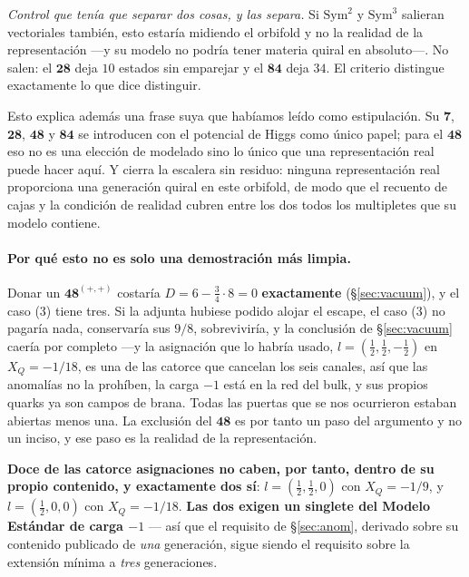 \documentclass[11pt,a4paper]{article}
\newcommand{\rep}[1]{\mathbf{#1}}
\newenvironment{keyeq}
  {\begin{center}\setlength{\fboxsep}{9pt}\setlength{\fboxrule}{0.8pt}%
   \begin{lrbox}{\keyeqbox}\begin{minipage}{0.88\textwidth}}
  {\end{minipage}\end{lrbox}%
   \fcolorbox{hdrblue!55}{hdrblue!6}{\usebox{\keyeqbox}}\end{center}}
\begin{document}
\emph{Control que tenía que separar dos cosas, y las separa.} Si $\mathrm{Sym}^2$ y $\mathrm{Sym}^3$
salieran vectoriales también, esto estaría midiendo el orbifold y no la realidad de la representación
---y su modelo no podría tener materia quiral en absoluto---. No salen: el $\rep{28}$ deja $10$
estados sin emparejar y el $\rep{84}$ deja $34$. El criterio distingue exactamente lo que dice
distinguir.

Esto explica además una frase suya que habíamos leído como estipulación. Su $\rep7$, $\rep{28}$,
$\rep{48}$ y $\rep{84}$ se introducen con el potencial de Higgs como único papel; para el $\rep{48}$
eso no es una elección de modelado sino lo único que una representación real puede hacer aquí. Y
cierra la escalera sin residuo: ninguna representación real proporciona una generación quiral en este
orbifold, de modo que el recuento de cajas y la condición de realidad cubren entre los dos todos los
multipletes que su modelo contiene.

\paragraph{Por qué esto no es solo una demostración más limpia.} Donar un $\rep{48}^{(+,+)}$ costaría
$D=6-\tfrac34\cdot8=0$ \textbf{exactamente} (\S\ref{sec:vacuum}), y el caso (3) tiene tres. Si la
adjunta hubiese podido alojar el escape, el caso (3) no pagaría nada, conservaría sus $9/8$,
sobreviviría, y la conclusión de \S\ref{sec:vacuum} caería por completo ---y la asignación que lo
habría usado, $l=(\tfrac12,\tfrac12,-\tfrac12)$ en $X_Q=-1/18$, es una de las catorce que cancelan
los seis canales, así que las anomalías no la prohíben, la carga $-1$ está en la red del bulk, y sus
propios quarks ya son campos de brana. Todas las puertas que se nos ocurrieron estaban abiertas menos
una. La exclusión del $\rep{48}$ es por tanto un paso del argumento y no un inciso, y ese paso es la
realidad de la representación.

\begin{keyeq}
\textbf{Doce de las catorce asignaciones no caben, por tanto, dentro de su propio contenido, y
exactamente dos sí}: $l=(\tfrac12,\tfrac12,0)$ con $X_Q=-1/9$, y $l=(\tfrac12,0,0)$ con
$X_Q=-1/18$. \textbf{Las dos exigen un singlete del Modelo Estándar de carga $-1$} --- así que el
requisito de \S\ref{sec:anom}, derivado sobre su contenido publicado de \emph{una} generación, sigue
siendo el requisito sobre la extensión mínima a \emph{tres} generaciones.
\end{keyeq}
\end{document}
